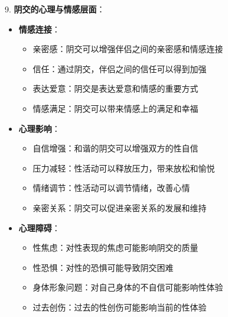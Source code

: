\documentclass[12pt,UTF8]{ctexbook}
\begin{document}
9. \textbf{阴交的心理与情感层面}：
\begin{itemize}
	\item \textbf{情感连接}：
	\begin{itemize}
		\item 亲密感：阴交可以增强伴侣之间的亲密感和情感连接
		\item 信任：通过阴交，伴侣之间的信任可以得到加强
		\item 表达爱意：阴交是表达爱意和情感的重要方式
		\item 情感满足：阴交可以带来情感上的满足和幸福
	\end{itemize}
	\item \textbf{心理影响}：
	\begin{itemize}
		\item 自信增强：和谐的阴交可以增强双方的性自信
		\item 压力减轻：性活动可以释放压力，带来放松和愉悦
		\item 情绪调节：性活动可以调节情绪，改善心情
		\item 亲密关系：阴交可以促进亲密关系的发展和维持
	\end{itemize}
	\item \textbf{心理障碍}：
	\begin{itemize}
		\item 性焦虑：对性表现的焦虑可能影响阴交的质量
		\item 性恐惧：对性的恐惧可能导致阴交困难
		\item 身体形象问题：对自己身体的不自信可能影响性体验
		\item 过去创伤：过去的性创伤可能影响当前的性体验
	\end{itemize}
\end{itemize}
\end{document}
